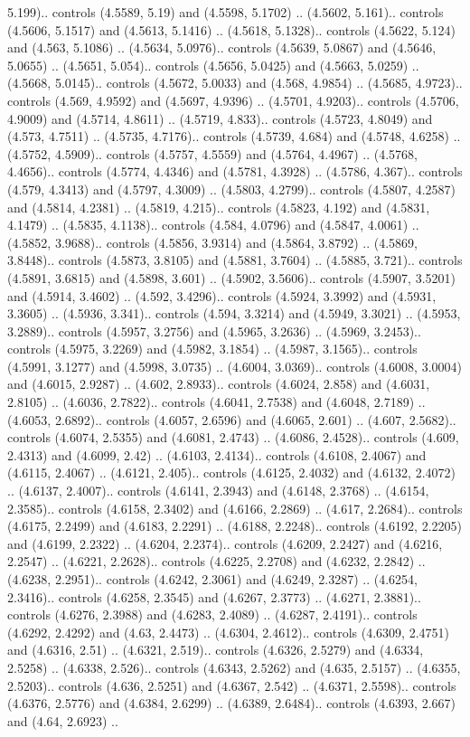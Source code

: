 5.199).. controls (4.5589, 5.19) and (4.5598, 5.1702) .. (4.5602, 5.161).. controls (4.5606, 5.1517) and (4.5613, 5.1416) .. (4.5618, 5.1328).. controls (4.5622, 5.124) and (4.563, 5.1086) .. (4.5634, 5.0976).. controls (4.5639, 5.0867) and (4.5646, 5.0655) .. (4.5651, 5.054).. controls (4.5656, 5.0425) and (4.5663, 5.0259) .. (4.5668, 5.0145).. controls (4.5672, 5.0033) and (4.568, 4.9854) .. (4.5685, 4.9723).. controls (4.569, 4.9592) and (4.5697, 4.9396) .. (4.5701, 4.9203).. controls (4.5706, 4.9009) and (4.5714, 4.8611) .. (4.5719, 4.833).. controls (4.5723, 4.8049) and (4.573, 4.7511) .. (4.5735, 4.7176).. controls (4.5739, 4.684) and (4.5748, 4.6258) .. (4.5752, 4.5909).. controls (4.5757, 4.5559) and (4.5764, 4.4967) .. (4.5768, 4.4656).. controls (4.5774, 4.4346) and (4.5781, 4.3928) .. (4.5786, 4.367).. controls (4.579, 4.3413) and (4.5797, 4.3009) .. (4.5803, 4.2799).. controls (4.5807, 4.2587) and (4.5814, 4.2381) .. (4.5819, 4.215).. controls (4.5823, 4.192) and (4.5831, 4.1479) .. (4.5835, 4.1138).. controls (4.584, 4.0796) and (4.5847, 4.0061) .. (4.5852, 3.9688).. controls (4.5856, 3.9314) and (4.5864, 3.8792) .. (4.5869, 3.8448).. controls (4.5873, 3.8105) and (4.5881, 3.7604) .. (4.5885, 3.721).. controls (4.5891, 3.6815) and (4.5898, 3.601) .. (4.5902, 3.5606).. controls (4.5907, 3.5201) and (4.5914, 3.4602) .. (4.592, 3.4296).. controls (4.5924, 3.3992) and (4.5931, 3.3605) .. (4.5936, 3.341).. controls (4.594, 3.3214) and (4.5949, 3.3021) .. (4.5953, 3.2889).. controls (4.5957, 3.2756) and (4.5965, 3.2636) .. (4.5969, 3.2453).. controls (4.5975, 3.2269) and (4.5982, 3.1854) .. (4.5987, 3.1565).. controls (4.5991, 3.1277) and (4.5998, 3.0735) .. (4.6004, 3.0369).. controls (4.6008, 3.0004) and (4.6015, 2.9287) .. (4.602, 2.8933).. controls (4.6024, 2.858) and (4.6031, 2.8105) .. (4.6036, 2.7822).. controls (4.6041, 2.7538) and (4.6048, 2.7189) .. (4.6053, 2.6892).. controls (4.6057, 2.6596) and (4.6065, 2.601) .. (4.607, 2.5682).. controls (4.6074, 2.5355) and (4.6081, 2.4743) .. (4.6086, 2.4528).. controls (4.609, 2.4313) and (4.6099, 2.42) .. (4.6103, 2.4134).. controls (4.6108, 2.4067) and (4.6115, 2.4067) .. (4.6121, 2.405).. controls (4.6125, 2.4032) and (4.6132, 2.4072) .. (4.6137, 2.4007).. controls (4.6141, 2.3943) and (4.6148, 2.3768) .. (4.6154, 2.3585).. controls (4.6158, 2.3402) and (4.6166, 2.2869) .. (4.617, 2.2684).. controls (4.6175, 2.2499) and (4.6183, 2.2291) .. (4.6188, 2.2248).. controls (4.6192, 2.2205) and (4.6199, 2.2322) .. (4.6204, 2.2374).. controls (4.6209, 2.2427) and (4.6216, 2.2547) .. (4.6221, 2.2628).. controls (4.6225, 2.2708) and (4.6232, 2.2842) .. (4.6238, 2.2951).. controls (4.6242, 2.3061) and (4.6249, 2.3287) .. (4.6254, 2.3416).. controls (4.6258, 2.3545) and (4.6267, 2.3773) .. (4.6271, 2.3881).. controls (4.6276, 2.3988) and (4.6283, 2.4089) .. (4.6287, 2.4191).. controls (4.6292, 2.4292) and (4.63, 2.4473) .. (4.6304, 2.4612).. controls (4.6309, 2.4751) and (4.6316, 2.51) .. (4.6321, 2.519).. controls (4.6326, 2.5279) and (4.6334, 2.5258) .. (4.6338, 2.526).. controls (4.6343, 2.5262) and (4.635, 2.5157) .. (4.6355, 2.5203).. controls (4.636, 2.5251) and (4.6367, 2.542) .. (4.6371, 2.5598).. controls (4.6376, 2.5776) and (4.6384, 2.6299) .. (4.6389, 2.6484).. controls (4.6393, 2.667) and (4.64, 2.6923) .. 